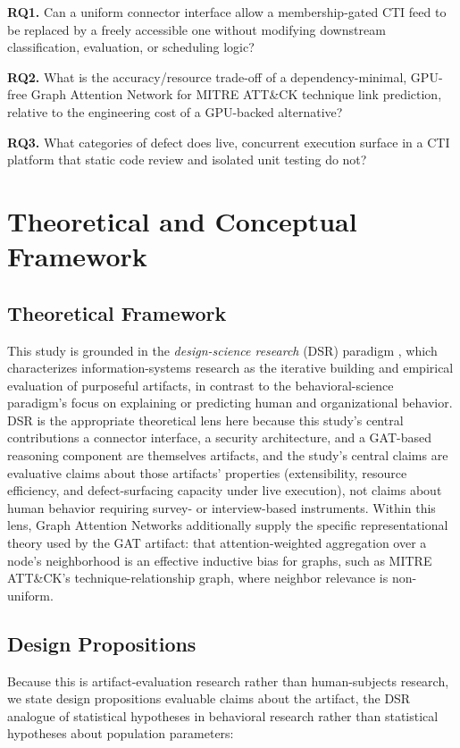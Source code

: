 \documentclass[conference]{IEEEtran}
\begin{document}
\textbf{RQ1.} Can a uniform connector interface allow a membership-gated CTI feed to be replaced by a freely accessible one without modifying downstream classification, evaluation, or scheduling logic?

\textbf{RQ2.} What is the accuracy/resource trade-off of a dependency-minimal, GPU-free Graph Attention Network for MITRE ATT\&CK technique link prediction, relative to the engineering cost of a GPU-backed alternative?

\textbf{RQ3.} What categories of defect does live, concurrent execution surface in a CTI platform that static code review and isolated unit testing do not?

\section{Theoretical and Conceptual Framework}
\label{sec:framework}

\subsection{Theoretical Framework}
This study is grounded in the \emph{design-science research} (DSR) paradigm \cite{hevner2004design}, which characterizes information-systems research as the iterative building and empirical evaluation of purposeful artifacts, in contrast to the behavioral-science paradigm's focus on explaining or predicting human and organizational behavior. DSR is the appropriate theoretical lens here because this study's central contributions \textemdash{} a connector interface, a security architecture, and a GAT-based reasoning component \textemdash{} are themselves artifacts, and the study's central claims are evaluative claims about those artifacts' properties (extensibility, resource efficiency, and defect-surfacing capacity under live execution), not claims about human behavior requiring survey- or interview-based instruments. Within this lens, Graph Attention Networks \cite{velickovic2018gat} additionally supply the specific representational theory used by the GAT artifact: that attention-weighted aggregation over a node's neighborhood is an effective inductive bias for graphs, such as MITRE ATT\&CK's technique-relationship graph, where neighbor relevance is non-uniform.

\subsection{Design Propositions}
\label{sec:propositions}
Because this is artifact-evaluation research rather than human-subjects research, we state design propositions \textemdash{} evaluable claims about the artifact, the DSR analogue of statistical hypotheses in behavioral research \textemdash{} rather than statistical hypotheses about population parameters:
\end{document}
